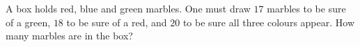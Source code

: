 A box holds red, blue and green marbles. One must draw $17$ marbles to be sure of a green, $18$ to be sure of a red, and $20$ to be sure all three colours appear. How many marbles are in the box?
